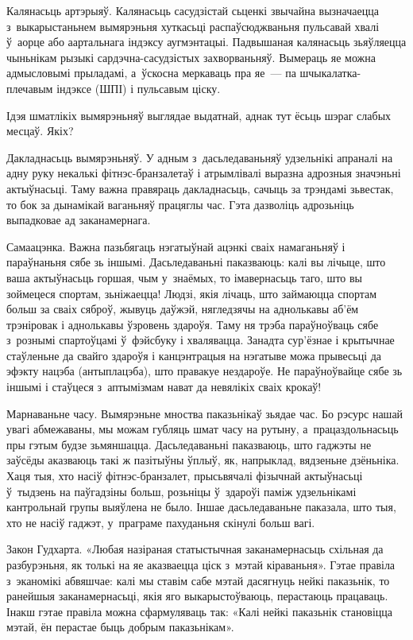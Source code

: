 Калянасьць артэрыяў. Калянасьць сасудзістай сьценкі звычайна вызначаецца з~выкарыстаньнем вымярэньня хуткасьці распаўсюджваньня пульсавай хвалі ў~аорце або аартальнага індэксу аугмэнтацыі. Падвышаная калянасьць зьяўляецца чыньнікам рызыкі сардэчна-сасудзістых захворваньняў. Вымераць яе можна адмысловымі прыладамі, а~ўскосна меркаваць пра яе~--- па шчыкалатка-плечавым індэксе (ШПІ) і пульсавым ціску.

Ідэя шматлікіх вымярэньняў выглядае выдатнай, аднак тут ёсьць шэраг слабых месцаў. Якіх?

Дакладнасьць вымярэньняў. У адным з~дасьледаваньняў удзельнікі апраналі на адну руку некалькі фітнэс-бранзалетаў і атрымлівалі выразна адрозныя значэньні актыўнасьці. Таму важна правяраць дакладнасьць, сачыць за трэндамі зьвестак, то бок за дынамікай ваганьняў працяглы час. Гэта дазволіць адрозьніць выпадковае ад заканамернага.

Самаацэнка. Важна пазьбягаць нэгатыўнай ацэнкі сваіх намаганьняў і параўнаньня сябе зь іншымі. Дасьледаваньні паказваюць: калі вы лічыце, што ваша актыўнасьць горшая, чым у~знаёмых, то імавернасьць таго, што вы зоймецеся спортам, зьніжаецца! Людзі, якія лічаць, што займаюцца спортам больш за сваіх сяброў, жывуць даўжэй, нягледзячы на аднолькавы аб'ём трэніровак і аднолькавы ўзровень здароўя. Таму ня трэба параўноўваць сябе з~рознымі спартоўцамі ў~фэйсбуку і хвалявацца. Занадта сур'ёзнае і крытычнае стаўленьне да свайго здароўя і канцэнтрацыя на нэгатыве можа прывесьці да эфэкту нацэба (антыплацэба), што правакуе нездароўе. Не параўноўвайце сябе зь іншымі і стаўцеся з~аптымізмам нават да невялікіх сваіх крокаў!

Марнаваньне часу. Вымярэньне мноства паказьнікаў зьядае час. Бо рэсурс нашай увагі абмежаваны, мы можам губляць шмат часу на рутыну, а~працаздольнасьць пры гэтым будзе зьмяншацца. Дасьледаваньні паказваюць, што гаджэты не заўсёды аказваюць такі ж пазітыўны ўплыў, як, напрыклад, вядзеньне дзёньніка. Хаця тыя, хто насіў фітнэс-бранзалет, прысьвячалі фізычнай актыўнасьці ў~тыдзень на паўгадзіны больш, розьніцы ў~здароўі паміж удзельнікамі кантрольнай групы выяўлена не было. Іншае дасьледаваньне паказала, што тыя, хто не насіў гаджэт, у~праграме пахуданьня скінулі больш вагі.

Закон Гудхарта. «Любая назіраная статыстычная заканамернасьць схільная да разбурэньня, як толькі на яе аказваецца ціск з~мэтай кіраваньня». Гэтае правіла з~эканомікі абвяшчае: калі мы ставім сабе мэтай дасягнуць нейкі паказьнік, то ранейшыя заканамернасьці, якія яго выкарыстоўваюць, перастаюць працаваць. Інакш гэтае правіла можна сфармуляваць так: «Калі нейкі паказьнік становіцца мэтай, ён перастае быць добрым паказьнікам».

